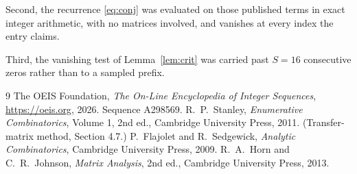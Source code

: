 \documentclass[11pt,a4paper]{article}
\theoremstyle{plain}
\theoremstyle{definition}
\begin{document}
Second, the recurrence \eqref{eq:conj} was evaluated on those published terms in exact
integer arithmetic, with no matrices involved, and vanishes at every index the entry claims.

Third, the vanishing test of Lemma~\ref{lem:crit} was carried past $S=16$ consecutive
zeros rather than to a sampled prefix.

\begin{thebibliography}{9}
 The OEIS Foundation, \emph{The On-Line Encyclopedia of Integer
Sequences}, \url{https://oeis.org}, 2026. Sequence A298569.
 R.~P.~Stanley, \emph{Enumerative Combinatorics}, Volume 1, 2nd ed.,
Cambridge University Press, 2011. (Transfer-matrix method, Section 4.7.)
 P.~Flajolet and R.~Sedgewick, \emph{Analytic Combinatorics}, Cambridge
University Press, 2009.
 R.~A.~Horn and C.~R.~Johnson, \emph{Matrix Analysis}, 2nd ed., Cambridge
University Press, 2013.
\end{thebibliography}
\end{document}
